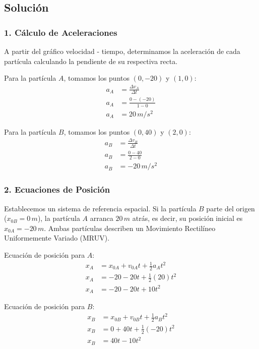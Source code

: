 \documentclass[12pt, a4paper]{article}
\begin{document}
\subsection*{Solución}

\subsubsection*{1. Cálculo de Aceleraciones}
A partir del gráfico velocidad - tiempo, determinamos la aceleración de cada partícula calculando la pendiente de su respectiva recta.

Para la partícula $A$, tomamos los puntos $(0, -20)$ y $(1, 0)$:
\begin{align*}
a_A &= \frac{\Delta v_A}{\Delta t} \\
a_A &= \frac{0 - (-20)}{1 - 0} \\
a_A &= 20 \, \si{m/s^2}
\end{align*}

Para la partícula $B$, tomamos los puntos $(0, 40)$ y $(2, 0)$:
\begin{align*}
a_B &= \frac{\Delta v_B}{\Delta t} \\
a_B &= \frac{0 - 40}{2 - 0} \\
a_B &= -20 \, \si{m/s^2}
\end{align*}

\subsubsection*{2. Ecuaciones de Posición}
Establecemos un sistema de referencia espacial. Si la partícula $B$ parte del origen ($x_{0B} = 0 \, \si{m}$), la partícula $A$ arranca $20 \, \si{m}$ atrás, es decir, su posición inicial es $x_{0A} = -20 \, \si{m}$.
Ambas partículas describen un Movimiento Rectilíneo Uniformemente Variado (MRUV).

Ecuación de posición para $A$:
\begin{align*}
x_A &= x_{0A} + v_{0A}t + \frac{1}{2}a_At^2 \\
x_A &= -20 - 20t + \frac{1}{2}(20)t^2 \\
x_A &= -20 - 20t + 10t^2
\end{align*}

Ecuación de posición para $B$:
\begin{align*}
x_B &= x_{0B} + v_{0B}t + \frac{1}{2}a_Bt^2 \\
x_B &= 0 + 40t + \frac{1}{2}(-20)t^2 \\
x_B &= 40t - 10t^2
\end{align*}
\end{document}

